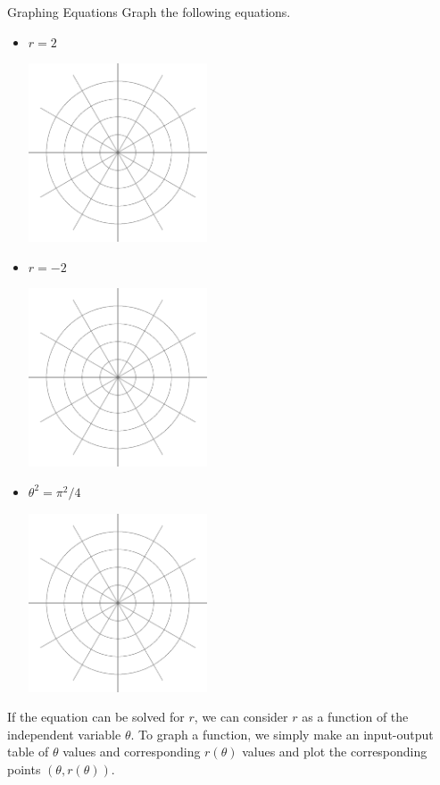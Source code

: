 \begin{exercise}{Graphing Equations \Coffeecup \Coffeecup }
Graph the following equations.

\begin{itemize}
\item $r=2$
	\begin{center}
		\includegraphics[width=150pt]{polar.eps}
	\end{center}
\item $r=-2$
	\begin{center}
		\includegraphics[width=150pt]{polar.eps}
	\end{center}
\item $\theta^2=\pi^2/4$
	\begin{center}
		\includegraphics[width=150pt]{polar.eps}
	\end{center}
\end{itemize}
\end{exercise}

If the equation can be solved for $r$, we can consider $r$ as a function of the independent variable $\theta$.  To graph a function, we simply make an input-output table of $\theta$ values and corresponding $r(\theta)$ values and plot the corresponding points $\left( \theta , r(\theta)\right)$.

